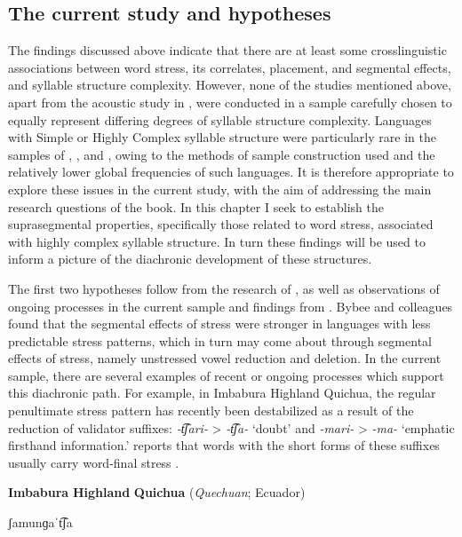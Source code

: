 \subsection{The current study and hypotheses}\label{sec:5.1.3}

  The findings discussed above indicate that there are at least some crosslinguistic associations between word stress, its correlates, placement, and segmental effects, and syllable structure complexity. However, none of the studies mentioned above, apart from the acoustic study in \citet{EasterdayEtAl2011}, were conducted in a sample carefully chosen to equally represent differing degrees of syllable structure complexity. Languages with Simple or Highly Complex syllable structure were particularly rare in the samples of \citet{Auer1993}, \citet{BybeeEtAl1998}, and \citet{Schiering2007}, owing to the methods of sample construction used and the relatively lower global frequencies of such languages. It is therefore appropriate to explore these issues in the current study, with the aim of addressing the main research questions of the book. In this chapter I seek to establish the suprasegmental properties, specifically those related to word stress, associated with highly complex syllable structure. In turn these findings will be used to inform a picture of the diachronic development of these structures.

  The first two hypotheses follow from the research of \citet{BybeeEtAl1998}, as well as observations of ongoing processes in the current sample and findings from . Bybee and colleagues found that the segmental effects of stress were stronger in languages with less predictable stress patterns, which in turn may come about through segmental effects of stress, namely unstressed vowel reduction and deletion. In the current sample, there are several examples of recent or ongoing processes which support this diachronic path. For example, in Imbabura Highland Quichua, the regular penultimate stress pattern has recently been destabilized as a result of the reduction of validator suffixes: \textit{-t͡ʃari-} > \textit{-t͡ʃa-} ‘doubt’ and \textit{-mari-} > \textit{-ma-} ‘emphatic firsthand information.’ \citet{Cole1982} reports that words with the short forms of these suffixes usually carry word-final stress .

\ea\label{ex:(5.1)}
  \textbf{Imbabura} \textbf{Highland} \textbf{Quichua} (\textit{Quechuan}; Ecuador)

ʃamunɡaˈt͡ʃa

